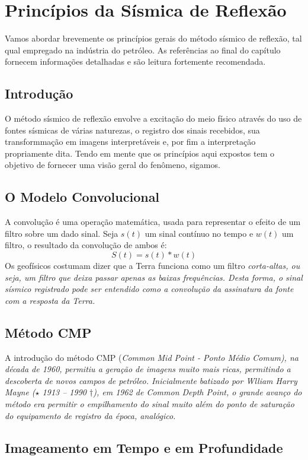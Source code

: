 \documentclass[0000]{subfiles}
\begin{document}
\chapter{Princ\'ipios da S\'ismica de Reflex\~ao}

Vamos abordar brevemente os princ\'ipios gerais do m\'etodo s\'ismico de reflex\~ao,
tal qual empregado na ind\'ustria do petr\'oleo.
As refer\^encias ao final do cap\'itulo fornecem informa\c{c}\~oes detalhadas e s\~ao leitura fortemente recomendada.
	
	\section{Introdu\c{c}\~ao}
O m\'etodo s\'ismico de reflexão envolve a excita\c{c}\~ao do meio f\'isico atrav\'es do uso de fontes s\'ismicas de v\'arias naturezas, o registro dos sinais recebidos, sua transformma\c{c}\~ao em imagens interpret\'aveis e, por fim a interpreta\c{c}\~ao propriamente dita.
Tendo em mente que os princ\'ipios aqui expostos tem o objetivo de fornecer uma vis\~ao geral do fen\^omeno, sigamos.

	\section{O Modelo Convolucional}
A convolu\c{c}\~ao \'e uma opera\c{c}\~ao matem\'atica, usada para representar o efeito de um filtro sobre um dado sinal.
Seja $s(t)$ um sinal cont\'inuo no tempo e $w(t)$ um filtro, o resultado da convolu\c{c}\~ao de ambos \'e:
\begin{equation}
S(t) = s(t) * w(t)
\end{equation}
Os geof\'isicos costumam dizer que a Terra funciona como um filtro \em{corta-altas}, ou seja, um filtro que deixa passar apenas as baixas frequ\^encias.
Desta forma, o sinal s\'ismico registrado pode ser entendido como a convolu\c{c}\~ao da assinatura da fonte com a resposta da Terra.
	\section{M\'etodo CMP}
A introdu\c{c}\~ao do m\'etodo CMP (\em{Common Mid Point} - Ponto M\'edio Comum), na d\'ecada de 1960, permitiu a gera\c{c}\~ao de imagens muito mais ricas, permitindo a descoberta de novos campos de petr\'oleo.
Inicialmente batizado por Wlliam Harry Mayne ($\star$ 1913 -- 1990 $\dagger$), em 1962 de \emph{Common Depth Point}, o grande avan\c{c}o do m\'etodo era permitir o empilhamento do sinal muito al\'em do ponto de satura\c{c}\~ao do equipamento de registro da \'epoca, anal\'ogico.
	\section{Imageamento em Tempo e em Profundidade}
\end{document}
